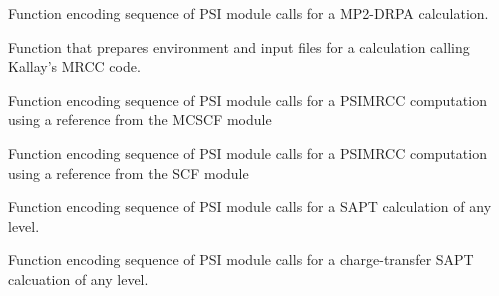 \documentclass[letterpaper,10pt,english]{sphinxmanual}
\begin{document}
\begin{fulllineitems}
\label{index:proc.run_mp2drpa}
Function encoding sequence of PSI module calls for
a MP2-DRPA calculation.

\end{fulllineitems}


\begin{fulllineitems}
\label{index:proc.run_mrcc}
Function that prepares environment and input files
for a calculation calling Kallay's MRCC code.

\end{fulllineitems}


\begin{fulllineitems}
\label{index:proc.run_psimrcc}
Function encoding sequence of PSI module calls for a PSIMRCC computation
using a reference from the MCSCF module

\end{fulllineitems}


\begin{fulllineitems}
\label{index:proc.run_psimrcc_scf}
Function encoding sequence of PSI module calls for a PSIMRCC computation
using a reference from the SCF module

\end{fulllineitems}


\begin{fulllineitems}
\label{index:proc.run_sapt}
Function encoding sequence of PSI module calls for
a SAPT calculation of any level.

\end{fulllineitems}


\begin{fulllineitems}
\label{index:proc.run_sapt_ct}
Function encoding sequence of PSI module calls for
a charge-transfer SAPT calcuation of any level.

\end{fulllineitems}
\end{document}
